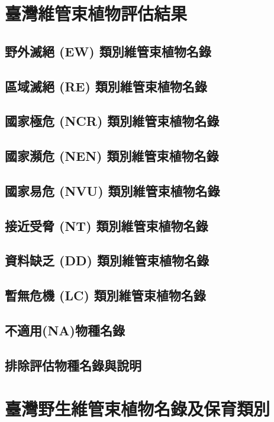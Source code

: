 \chapter{臺灣維管束植物評估結果}


\section{野外滅絕 (EW) 類別維管束植物名錄}

\section{區域滅絕 (RE) 類別維管束植物名錄}

\section{國家極危 (NCR) 類別維管束植物名錄}

\section{國家瀕危 (NEN) 類別維管束植物名錄}
\section{國家易危 (NVU) 類別維管束植物名錄}
\section{接近受脅 (NT) 類別維管束植物名錄}
\section{資料缺乏 (DD) 類別維管束植物名錄}
\section{暫無危機 (LC) 類別維管束植物名錄}
\section{不適用(NA)物種名錄}
\section{排除評估物種名錄與說明}

\chapter{臺灣野生維管束植物名錄及保育類別}

